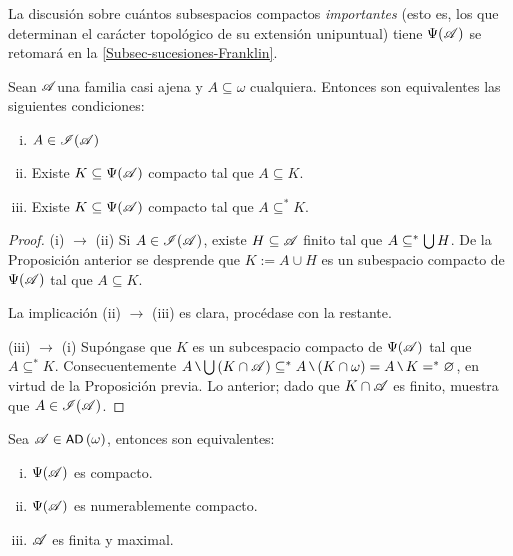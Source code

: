 	La discusión sobre cuántos subsespacios compactos \textit{importantes} (esto es, los que determinan el carácter topológico de su extensión unipuntual) tiene $\Psi(\mathscr{A})$ se retomará en la \autoref{Subsec-sucesiones-Franklin}.
	
	\begin{corolario}\label{cor-IdealCompactosCarac}
		Sean $\mathscr{A}$una familia casi ajena y $A \subseteq \omega$ cualquiera. Entonces son equivalentes las siguientes condiciones:
		\begin{enumerate}[i)]
			\item $A \in \mathscr{I}(\mathscr{A})$
			\item Existe $K \subseteq \Psi(\mathscr{A})$ compacto tal que $A \subseteq K$.
			\item Existe $K \subseteq \Psi(\mathscr{A})$ compacto tal que $A \subseteq^* K$.
		\end{enumerate}
	\end{corolario}
	
	\begin{proof} 
		(i) $\to$ (ii) Si $A \in \mathscr{I}(\mathscr{A})$, existe $H \subseteq \mathscr{A}$ finito tal que $A \subseteq^* \mbox{$\bigcup$}\, H$. De la Proposición anterior se desprende que $K:=A \cup H$ es un subespacio compacto de $\Psi(\mathscr{A})$ tal que $A \subseteq K$.
		
		La implicación (ii) $\to$ (iii) es clara, procédase con la restante.
		
		(iii) $\to$ (i) Supóngase que $K$ es un subcespacio compacto de $\Psi(\mathscr{A})$ tal que $A \subseteq^* K$. Consecuentemente $A \setminus \midcup (K \cap \ms{A}) \subseteq^* A \setminus (K \cap \omega) = A \setminus K =^* \emptyset$, en virtud de la Proposición previa. Lo anterior; dado que $K \cap \mathscr{A}$ es finito, muestra que $A \in \mathscr{I}(\mathscr{A})$.
	\end{proof}
	
	\begin{proposicion}\label{prop-tra-compacidad}
		Sea $\mathscr{A}\in \operatorname{\text{\textsf{\small AD}}}\,(\omega)$, entonces son equivalentes:
		\begin{enumerate}[i)]
			\item $\Psi(\mathscr{A})$ es compacto.
			\item $\Psi(\mathscr{A})$ es numerablemente compacto.
			\item $\mathscr{A}$ es finita y maximal.
		\end{enumerate}
	\end{proposicion}
	
